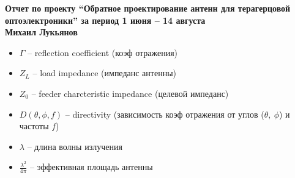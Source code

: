 \documentclass[a4paper, 12pt]{article}
\begin{document}
\newcommand{\listOn}{\begin{itemize}\setlength\itemsep{0pt}}
\newcommand{\listOff}{\end{itemize}}

\newcommand{\listNumOn}{\begin{enumerate}\setlength\itemsep{0pt}}
\newcommand{\listNumOff}{\end{enumerate}}

\newcommand{\pic}[5]{
  \begin{figure}[#1]
    \begin{minipage}{0.95\linewidth}
      \centering
      \texttt{[image: \#3]}
      \label{#5}
      \centering
    \end{minipage}
  \end{figure}
}
\begin{center}
    \large
    \bfseries
    Отчет по проекту ``Обратное проектирование антенн для терагерцовой оптоэлектроники'' за период 1 июня -- 14 августа \\
    \normalfont
    Михаил Лукьянов \\
\end{center}



\listOn
\item $\Gamma$ -- reflection coefficient (коэф отражения)
\item $Z_L$ -- load impedance (импеданс антенны)
\item $Z_0$ -- feeder charcteristic impedance (целевой импеданс)
\item $D(\theta, \phi, f)$ -- directivity (зависимость коэф отражения от углов ($\theta,\ \phi$) и частоты $f$)
\item $\lambda$ -- длина волны излучения
\item $\frac{\lambda^2}{4 \pi}$ -- эффективная площадь антенны
\listOff
\end{document}
